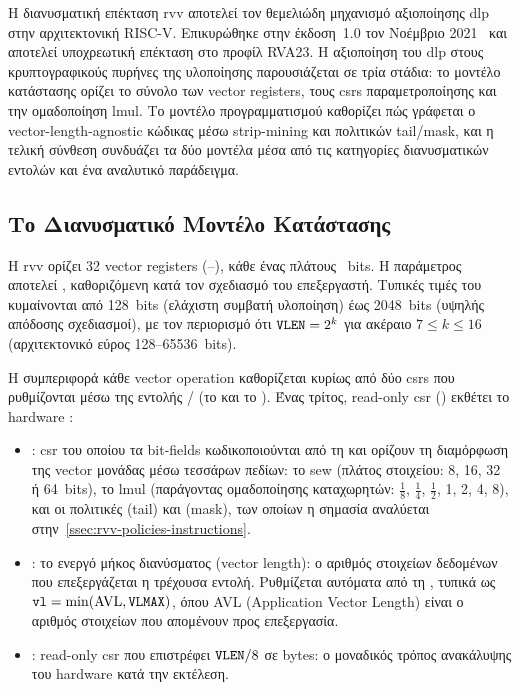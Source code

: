 Η διανυσματική επέκταση \gls{rvv} αποτελεί τον θεμελιώδη μηχανισμό
αξιοποίησης \gls{dlp} στην αρχιτεκτονική RISC-V. Επικυρώθηκε στην
έκδοση~1.0 τον Νοέμβριο 2021~\cite{RISCV-vector-spec,RISCV-ratified-ext} και αποτελεί υποχρεωτική
επέκταση στο προφίλ RVA23. Η αξιοποίηση του \gls{dlp} στους κρυπτογραφικούς πυρήνες της υλοποίησης
παρουσιάζεται σε τρία στάδια: το μοντέλο κατάστασης ορίζει το σύνολο των
vector registers, τους \glspl{csr} παραμετροποίησης και την ομαδοποίηση
\gls{lmul}. Το μοντέλο προγραμματισμού καθορίζει πώς γράφεται ο
vector-length-agnostic κώδικας μέσω strip-mining και πολιτικών tail/mask,
και η τελική σύνθεση συνδυάζει τα δύο μοντέλα μέσα από τις κατηγορίες
διανυσματικών εντολών και ένα αναλυτικό παράδειγμα.

\subsection{Το Διανυσματικό Μοντέλο Κατάστασης}
\label{ssec:rvv-vla}
\label{ssec:rvv-csrs}

Η \gls{rvv} ορίζει \num{32} vector registers (–), κάθε
ένας πλάτους \VLEN~bits. Η παράμετρος \VLEN αποτελεί
, καθοριζόμενη κατά τον σχεδιασμό του
επεξεργαστή. Τυπικές τιμές του \VLEN κυμαίνονται από \num{128}~bits (ελάχιστη
συμβατή υλοποίηση) έως \num{2048}~bits (υψηλής απόδοσης σχεδιασμοί), με
τον περιορισμό ότι $\texttt{VLEN} = 2^k$ για ακέραιο $7 \leq k \leq 16$
(αρχιτεκτονικό εύρος \num{128}–\num{65536}~bits).

Η συμπεριφορά κάθε vector operation καθορίζεται κυρίως από δύο \glspl{csr}
που ρυθμίζονται μέσω της εντολής / (το
 και το ). Ένας τρίτος, read-only \gls{csr}
() εκθέτει το hardware \VLEN:

\begin{itemize}
  \item {}: \gls{csr} του οποίου τα bit-fields κωδικοποιούνται
    από τη  και ορίζουν τη διαμόρφωση της vector μονάδας μέσω
    τεσσάρων πεδίων: το \gls{sew} (πλάτος στοιχείου: 8, 16, 32 ή 64~bits),
    το \gls{lmul} (παράγοντας ομαδοποίησης καταχωρητών: $\frac{1}{8}$,
    $\frac{1}{4}$, $\frac{1}{2}$, 1, 2, 4, 8), και οι πολιτικές 
    (tail) και  (mask), των οποίων η σημασία αναλύεται
    στην~\cref{ssec:rvv-policies-instructions}.
  \item {}: το ενεργό μήκος διανύσματος (vector length): ο αριθμός
    στοιχείων δεδομένων που επεξεργάζεται η τρέχουσα εντολή. Ρυθμίζεται
    αυτόματα από τη , τυπικά ως
    $\texttt{vl} = \min(\text{AVL}, \texttt{VLMAX})$, όπου AVL (Application Vector
    Length) είναι ο αριθμός στοιχείων που απομένουν προς επεξεργασία.
  \item {}: read-only \gls{csr} που επιστρέφει $\texttt{VLEN} / 8$ σε
    bytes: ο μοναδικός τρόπος ανακάλυψης του hardware \VLEN κατά την
    εκτέλεση.
\end{itemize}

